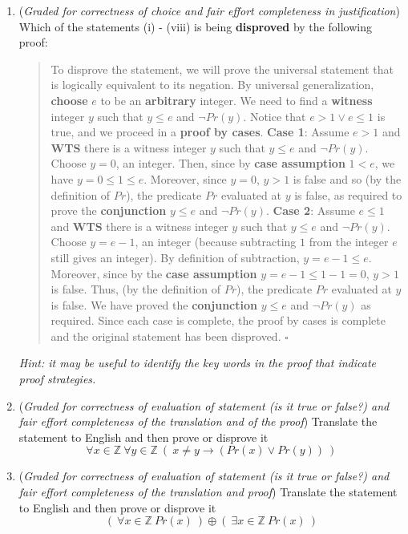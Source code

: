 \documentclass[12pt, oneside]{article}
\begin{document}
\begin{enumerate}
\begin{enumerate}
   \item ({\it Graded for correctness of choice and fair effort completeness in justification}) 
   Which of the statements (i) - (viii) is being {\bf disproved} by the following proof:
   \begin{quote}
     To disprove the statement, we will prove the universal
     statement that is logically equivalent to its negation. 
     By universal generalization, {\bf choose} $e$ to be an {\bf arbitrary} integer. 
     We need to find a {\bf witness} integer $y$ such that $y \leq e$ and $\lnot Pr(y)$.
     Notice that $e > 1 \lor e \leq 1$ is true, and we proceed in a {\bf proof by cases}.
     {\bf Case 1}: Assume $e > 1$ and {\bf WTS} there is a witness integer $y$ such that
     $y \leq e$ and $\lnot Pr(y)$. Choose $y = 0$, an integer. Then, since by {\bf case assumption}
     $1 < e$, we have $y = 0 \leq 1 \leq e$.
     Moreover, since $y = 0$, $y > 1$ is false and so (by the definition of $Pr$), the predicate $Pr$
     evaluated at $y$ is false, as required to prove the {\bf conjunction} $y \leq e$ and $\lnot Pr(y)$. 
     {\bf Case 2}: 
     Assume $e \leq 1$ and {\bf WTS} there is a witness integer $y$ such that
     $y \leq e$ and $\lnot Pr(y)$. Choose $y = e-1$, an integer (because subtracting
     $1$ from the integer $e$ still gives an integer). By definition of subtraction, $y = e-1 \leq e$.
     Moreover, since by the {\bf case assumption} $y = e-1 \leq 1-1= 0$, $y > 1$ is false. Thus, 
    (by the definition of $Pr$), the predicate $Pr$
     evaluated at $y$ is false. We have proved the {\bf conjunction} $y \leq e$ and $\lnot Pr(y)$ as required.
     Since each case is complete, the proof by cases is complete and the original
     statement has been disproved.  $\square$
   \end{quote}
   
   {\it Hint: it may be useful to 
   identify the key words in the proof that indicate proof strategies.}

   \item ({\it Graded for correctness of evaluation of statement (is it true or false?)
   and fair effort completeness of the translation and of the proof}) 
    Translate the statement to English and then prove or disprove it
   $$\forall x \in \mathbb{Z}~ \forall y \in \mathbb{Z}~(~x \neq y \to (Pr(x) \lor Pr(y))~)$$

   \item ({\it Graded for correctness of evaluation of statement (is it true or false?) 
   and fair effort completeness of the translation and proof}) 
   Translate the statement to English and then prove or disprove it
   $$\left( ~\forall x \in \mathbb{Z} ~Pr(x)~\right) \oplus \left(~\exists x \in \mathbb{Z} ~Pr(x) ~\right)$$


\end{enumerate}
\end{enumerate}
\end{document}
